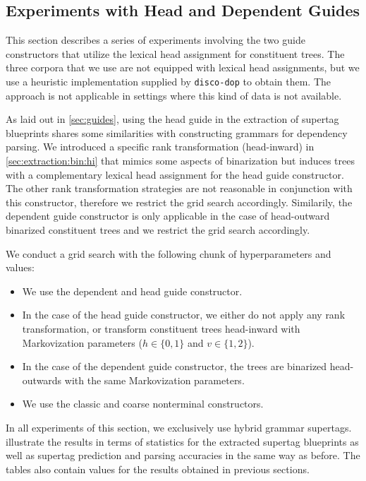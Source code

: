 \documentclass[../../document.tex]{subfiles}
\begin{document}
    \subsection{Experiments with Head and Dependent Guides}\label{sec:gridsearch:head}
    This section describes a series of experiments involving the two guide constructors that utilize the lexical head assignment for constituent trees.
    The three corpora that we use are not equipped with lexical head assignments, but we use a heuristic implementation supplied by \texttt{disco-dop} to obtain them.
    The approach is not applicable in settings where this kind of data is not available.

    As laid out in \cref{sec:guides}, using the head guide in the extraction of supertag blueprints shares some similarities with constructing grammars for dependency parsing.
    We introduced a specific rank transformation (head-inward) in \cref{sec:extraction:bin:hi} that mimics some aspects of binarization but induces trees with a complementary lexical head assignment for the head guide constructor.
    The other rank transformation strategies are not reasonable in conjunction with this constructor, therefore we restrict the grid search accordingly.
    Similarily, the dependent guide constructor is only applicable in the case of head-outward binarized constituent trees and we restrict the grid search accordingly.

    We conduct a grid search with the following chunk of hyperparameters and values:
    \begin{itemize}
        \item We use the dependent and head guide constructor.
        \item In the case of the head guide constructor, we either do not apply any rank transformation, or transform constituent trees head-inward with Markovization parameters ($h \in \{0,1\}$ and $v \in \{1,2\}$).
        \item In the case of the dependent guide constructor, the trees are binarized head-outwards with the same Markovization parameters.
        \item We use the classic and coarse nonterminal constructors.
    \end{itemize}
    In all experiments of this section, we exclusively use hybrid grammar supertags.
     illustrate the results in terms of statistics for the extracted supertag blueprints as well as supertag prediction and parsing accuracies in the same way as before.
    The tables also contain values for the results obtained in previous sections.
\end{document}

